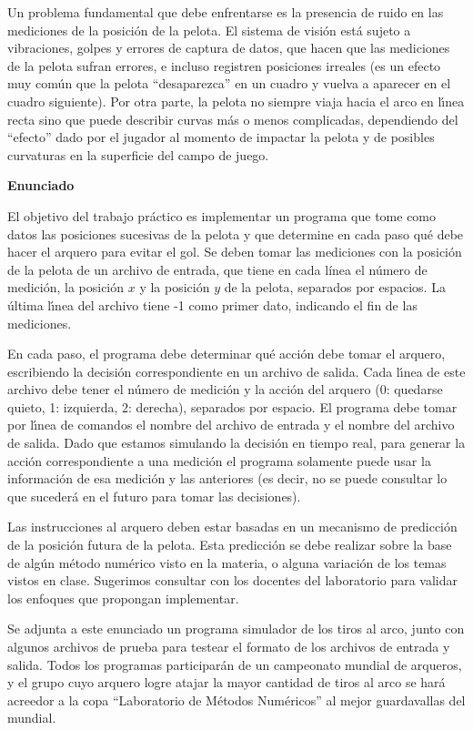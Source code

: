 Un problema fundamental que debe enfrentarse es la presencia de ruido
en las mediciones de la posici\'on de la pelota. El sistema de visi\'on
est\'a sujeto a vibraciones, golpes y errores de captura de datos,
que hacen que las mediciones de la pelota sufran errores, e incluso 
registren posiciones irreales (es un efecto muy com\'un que la pelota
``desaparezca'' en un cuadro y vuelva a aparecer en el cuadro siguiente).
Por otra parte, la pelota no siempre viaja hacia el arco en l\'\i nea
recta sino que puede describir curvas m\'as o menos complicadas,
dependiendo del ``efecto'' dado por el jugador al momento de impactar
la pelota y de posibles curvaturas en la superficie del campo de juego.

\textbf{Enunciado}

El objetivo del trabajo pr\'actico es implementar un programa que
tome como datos las posiciones sucesivas de la pelota y que determine
en cada paso qu\'e debe hacer el arquero para evitar el gol. Se deben
tomar las mediciones con la posici\'on de la pelota de un archivo
de entrada, que tiene en cada l\'inea el n\'umero de medici\'on,
la posici\'on $x$ y la posici\'on $y$ de la pelota, separados
por espacios. La \'ultima l\'\i nea del archivo tiene -1 como
primer dato, indicando el fin de las mediciones.

En cada paso, el programa debe determinar qu\'e acci\'on debe tomar
el arquero, escribiendo la decisi\'on correspondiente en un archivo
de salida. Cada l\'\i nea de este archivo debe tener el n\'umero
de medici\'on y la acci\'on del arquero (0: quedarse quieto, 1: izquierda,
2: derecha), separados por espacio. El programa debe tomar por
l\'\i nea de comandos el nombre del archivo de entrada y el nombre
del archivo de salida. Dado que estamos simulando
la decisi\'on en tiempo real, para generar la acci\'on correspondiente
a una medici\'on el programa solamente puede usar la informaci\'on
de esa medici\'on y las anteriores (es decir, no se puede consultar
lo que suceder\'a en el futuro para tomar las decisiones).

Las instrucciones al arquero deben estar basadas en un mecanismo de
predicci\'on de la posici\'on futura de la pelota. Esta predicci\'on
se debe realizar sobre la base de alg\'un m\'etodo num\'erico visto
en la materia, o alguna variaci\'on de los temas vistos en clase.
Sugerimos consultar con los docentes del laboratorio para validar
los enfoques que propongan implementar.

Se adjunta a este enunciado un programa simulador de los tiros al
arco, junto con algunos archivos de prueba para testear el formato
de los archivos de entrada y salida. Todos los programas participar\'an
de un campeonato mundial de arqueros, y el grupo cuyo arquero logre
atajar la mayor cantidad de tiros al arco se har\'a acreedor a la
copa ``Laboratorio de M\'etodos Num\'ericos'' al mejor guardavallas del
mundial.

